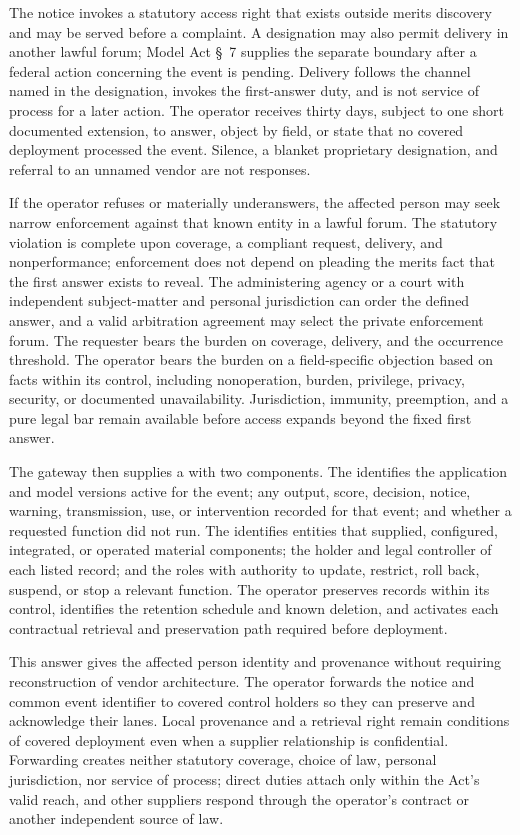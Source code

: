 The notice invokes a statutory access right that exists outside merits discovery and may be served before a complaint. A designation may also permit delivery in another lawful forum; Model Act \S~7 supplies the separate boundary after a federal action concerning the event is pending. Delivery follows the channel named in the designation, invokes the first-answer duty, and is not service of process for a later action. The operator receives thirty days, subject to one short documented extension, to answer, object by field, or state that no covered deployment processed the event. Silence, a blanket proprietary designation, and referral to an unnamed vendor are not responses.

If the operator refuses or materially underanswers, the affected person may seek narrow enforcement against that known entity in a lawful forum. The statutory violation is complete upon coverage, a compliant request, delivery, and nonperformance; enforcement does not depend on pleading the merits fact that the first answer exists to reveal. The administering agency or a court with independent subject-matter and personal jurisdiction can order the defined answer, and a valid arbitration agreement may select the private enforcement forum. The requester bears the burden on coverage, delivery, and the occurrence threshold. The operator bears the burden on a field-specific objection based on facts within its control, including nonoperation, burden, privilege, privacy, security, or documented unavailability. Jurisdiction, immunity, preemption, and a pure legal bar remain available before access expands beyond the fixed first answer.

The gateway then supplies a  with two components. The  identifies the application and model versions active for the event; any output, score, decision, notice, warning, transmission, use, or intervention recorded for that event; and whether a requested function did not run. The  identifies entities that supplied, configured, integrated, or operated material components; the holder and legal controller of each listed record; and the roles with authority to update, restrict, roll back, suspend, or stop a relevant function. The operator preserves records within its control, identifies the retention schedule and known deletion, and activates each contractual retrieval and preservation path required before deployment.

This answer gives the affected person identity and provenance without requiring reconstruction of vendor architecture. The operator forwards the notice and common event identifier to covered control holders so they can preserve and acknowledge their lanes. Local provenance and a retrieval right remain conditions of covered deployment even when a supplier relationship is confidential. Forwarding creates neither statutory coverage, choice of law, personal jurisdiction, nor service of process; direct duties attach only within the Act's valid reach, and other suppliers respond through the operator's contract or another independent source of law.

